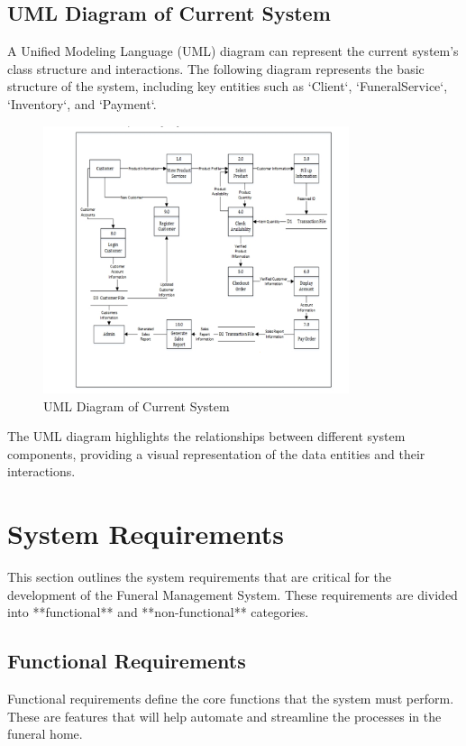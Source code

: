 \documentclass[a4paper,12pt]{report}
\begin{document}
\subsection{UML Diagram of Current System}
A Unified Modeling Language (UML) diagram can represent the current system’s class structure and interactions. The following diagram represents the basic structure of the system, including key entities such as `Client`, `FuneralService`, `Inventory`, and `Payment`.

\begin{figure}[ht]
\centering
\includegraphics[width=0.8\textwidth]{../img/activity.png}
\caption{UML Diagram of Current System}
\label{fig:current_system_uml}
\end{figure}

The UML diagram highlights the relationships between different system components, providing a visual representation of the data entities and their interactions.

\section{System Requirements}
This section outlines the system requirements that are critical for the development of the Funeral Management System. These requirements are divided into **functional** and **non-functional** categories.

\subsection{Functional Requirements}
Functional requirements define the core functions that the system must perform. These are features that will help automate and streamline the processes in the funeral home.
\end{document}
